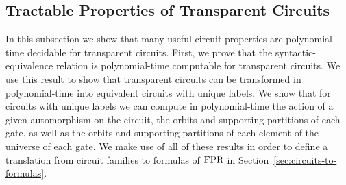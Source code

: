 \documentclass[../paper.tex]{subfiles}
\begin{document}
\subsection{Tractable Properties of Transparent Circuits}
In this subsection we show that many useful circuit properties are
polynomial-time decidable for transparent circuits. First, we prove that the
syntactic-equivalence relation is polynomial-time computable for transparent
circuits. We use this result to show that transparent circuits can be
transformed in polynomial-time into equivalent circuits with unique labels. We
show that for circuits with unique labels we can compute in polynomial-time the
action of a given automorphism on the circuit, the orbits and supporting
partitions of each gate, as well as the orbits and supporting partitions of each
element of the universe of each gate. We make use of all of these results in
order to define a translation from circuit families to formulas of $\text{\upshape FPR}$ in
Section~\ref{sec:circuits-to-formulas}.





\end{document}
